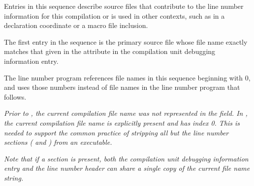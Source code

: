 \begin{enumerate}[1. ]
Entries in this sequence describe source files that
contribute to the line number information for this
compilation or is used in other contexts, such as in
a declaration coordinate or a macro file inclusion.
 
The first entry in the sequence is the primary source file 
whose file name exactly matches that given in the 
\DWATname{} attribute in the compilation unit 
debugging information entry.
   
The line number program references file names in this 
sequence beginning with 0, and uses those numbers instead 
of file names in the line number program that follows.

\textit{Prior to \DWARFVersionV, the current compilation 
file name was not represented in the 
field. In \DWARFVersionV, the current compilation file name 
is explicitly present and has index 0. This is needed to support 
the common practice of stripping all but the line number sections
(\dotdebugline{} and \dotdebuglinestr) from an executable.}

\textit{Note that if a \dotdebuglinestr{} section is present, 
both the compilation unit debugging information entry 
and the line number header can
share a single copy of the current file name string.}

\end{enumerate}

